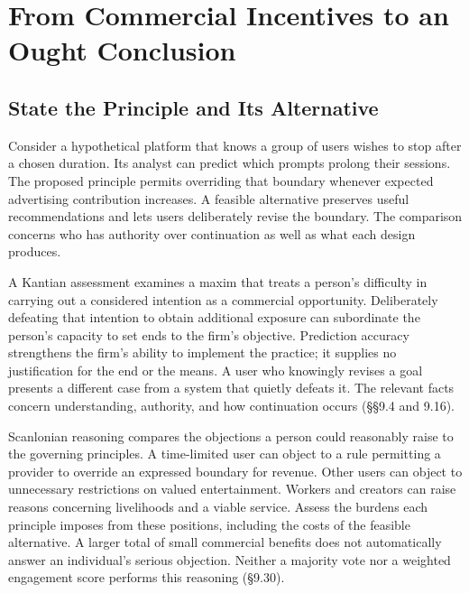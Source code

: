 
\hypertarget{M09-from-commercial-incentives-to-an-ought-conclusion}{%
\section{From Commercial Incentives to an Ought
Conclusion}\label{M09-from-commercial-incentives-to-an-ought-conclusion}}

\noindent \hypertarget{M09-state-the-principle-and-its-alternative}{%
\subsection{State the Principle and Its
Alternative}\label{M09-state-the-principle-and-its-alternative}}

\noindent \noindent Consider a hypothetical platform that knows a group of users
wishes to stop after a chosen duration. Its analyst can predict which
prompts prolong their sessions. The proposed principle permits
overriding that boundary whenever expected advertising contribution
increases. A feasible alternative preserves useful recommendations and
lets users deliberately revise the boundary. The comparison concerns who
has authority over continuation as well as what each design produces.

A Kantian assessment examines a maxim that treats a person's difficulty
in carrying out a considered intention as a commercial opportunity.
Deliberately defeating that intention to obtain additional exposure can
subordinate the person's capacity to set ends to the firm's objective.
Prediction accuracy strengthens the firm's ability to implement the
practice; it supplies no justification for the end or the means. A user
who knowingly revises a goal presents a different case from a system
that quietly defeats it. The relevant facts concern understanding,
authority, and how continuation occurs (§§9.4 and 9.16).

Scanlonian reasoning compares the objections a person could reasonably
raise to the governing principles. A time-limited user can object to a
rule permitting a provider to override an expressed boundary for
revenue. Other users can object to unnecessary restrictions on valued
entertainment. Workers and creators can raise reasons concerning
livelihoods and a viable service. Assess the burdens each principle
imposes from these positions, including the costs of the feasible
alternative. A larger total of small commercial benefits does not
automatically answer an individual's serious objection. Neither a
majority vote nor a weighted engagement score performs this reasoning
(§9.30).

